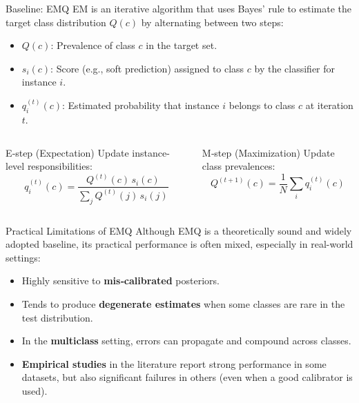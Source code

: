 \documentclass[aspectratio=169]{beamer}
\begin{document}
\begin{frame}{Baseline: EMQ}
  EM is an iterative algorithm that uses Bayes’ rule to estimate the target class distribution $Q(c)$ by alternating between two steps:
  
  \begin{itemize}
    \item $Q(c)$: Prevalence of class $c$ in the target set.
    \item $s_i(c)$: Score (e.g., soft prediction) assigned to class $c$ by the classifier for instance $i$.
    \item $q_i^{(t)}(c)$: Estimated probability that instance $i$ belongs to class $c$ at iteration $t$.
  \end{itemize}

  \begin{columns}
    \begin{column}{0.4\textwidth}
      \begin{block}{E‑step (Expectation)}
        \small
        Update instance-level responsibilities:
        $$q_i^{(t)}(c)=\frac{Q^{(t)}(c)\,s_i(c)}{\sum_{j}Q^{(t)}(j)\,s_i(j)}$$
      \end{block}
    \end{column}
    \begin{column}{0.4\textwidth}
      \begin{block}{M‑step (Maximization)}
        \small
        Update class prevalences:
        $$Q^{(t+1)}(c)=\frac{1}{N}\sum_i q_i^{(t)}(c)$$
      \end{block}
    \end{column}
  \end{columns}
\end{frame}


\begin{frame}{Practical Limitations of EMQ}
  Although EMQ is a theoretically sound and widely adopted baseline, its practical performance is often mixed, especially in real-world settings:

  \begin{itemize}
    \item Highly sensitive to \textbf{mis‑calibrated} posteriors.
    \item Tends to produce \textbf{degenerate estimates} when some classes are rare in the test distribution.
    \item In the \textbf{multiclass} setting, errors can propagate and compound across classes.\pause
    \item \textbf{Empirical studies} in the literature report strong performance in some datasets, but also significant failures in others (even when a good calibrator is used).
  \end{itemize}
\end{frame}
\end{document}
